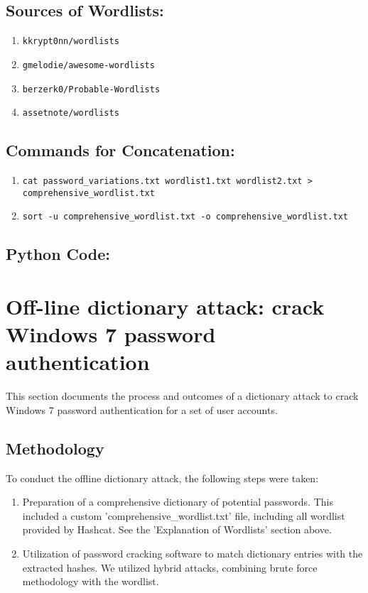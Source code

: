 \documentclass{article}
\begin{document}
\subsection*{Sources of Wordlists:}
\begin{enumerate}
    \item \texttt{kkrypt0nn/wordlists}
    \item \texttt{gmelodie/awesome-wordlists}
    \item \texttt{berzerk0/Probable-Wordlists}
    \item \texttt{assetnote/wordlists}
\end{enumerate}

\subsection*{Commands for Concatenation:}
\begin{enumerate}
    \item \texttt{cat password\_variations.txt wordlist1.txt wordlist2.txt > comprehensive\_wordlist.txt}
    \item \texttt{sort -u comprehensive\_wordlist.txt -o comprehensive\_wordlist.txt}
\end{enumerate}

\subsection*{Python Code:}


\section{Off-line dictionary attack: crack Windows 7 password authentication}
This section documents the process and outcomes of a dictionary attack to crack Windows 7 password authentication for a set of user accounts. 

\subsection{Methodology}
To conduct the offline dictionary attack, the following steps were taken:
\begin{enumerate}
    \item Preparation of a comprehensive dictionary of potential passwords. This included a custom 'comprehensive\_wordlist.txt' file, including all wordlist provided by Hashcat. See the 'Explanation of Wordlists' section above.
    \item Utilization of password cracking software to match dictionary entries with the extracted hashes. We utilized hybrid attacks, combining brute force methodology with the wordlist.

\end{enumerate}
\end{document}
